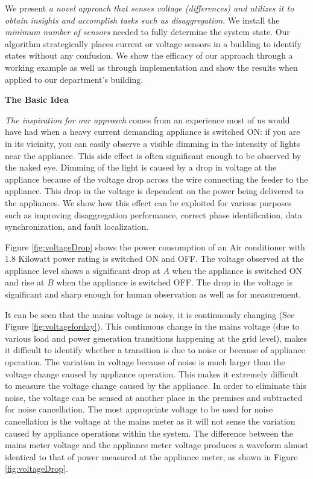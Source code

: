 We present {\em a novel approach that senses voltage (differences) and utilizes it to obtain insights and accomplish tasks such as disaggregation}. We install the \textit{minimum number of sensors} needed to fully determine the system state. Our algorithm strategically places current or voltage sensors in a building to identify states without any confusion. We show the efficacy of our approach through a working example as well as through implementation and show the results when applied to our department's building.

{\bf The Basic Idea}\label{IdentifyApp}

{\em The inspiration for our approach} comes from an experience most of us would have had when a heavy current demanding appliance is switched ON: if you are in its vicinity, you can easily observe a visible dimming in the intensity of lights near the appliance. This side effect is often significant enough to be observed by the naked eye. Dimming of the light is caused by a drop in voltage at the appliance because of the voltage drop across the wire connecting the feeder to the appliance. This drop in the voltage is dependent on the power being delivered to the appliances.
We show how this effect can be exploited for various purposes such as improving disaggregation performance, correct phase identification, data synchronization, and fault localization.

Figure \ref{fig:voltageDrop} shows the power consumption of an Air conditioner with 1.8 Kilowatt power rating is switched ON and OFF. The voltage observed at the appliance level shows a significant drop at $A$ when the appliance is switched ON and rise at $B$ when the appliance is switched OFF. The drop in the voltage is significant and sharp enough for human observation as well as for measurement.

It can be seen that the mains voltage is noisy, it is continuously changing (See Figure \ref{fig:voltageforday}). This continuous change in the mains voltage (due to various load and power generation transitions happening at the grid level), makes it difficult to identify whether a transition is due to noise or because of appliance operation.
The variation in voltage because of noise is much larger than the voltage change caused by appliance operation. This makes it extremely difficult to measure the voltage change caused by the appliance.
In order to eliminate this noise, the voltage can be sensed at another place in the premises and subtracted for noise cancellation.
The most appropriate voltage to be used for noise cancellation is the voltage at the mains meter as it will not sense the variation caused by appliance operations within the system.
The difference between the mains meter voltage and the appliance meter voltage produces a waveform almost identical to that of power measured at the appliance meter, as shown in Figure \ref{fig:voltageDrop}.
